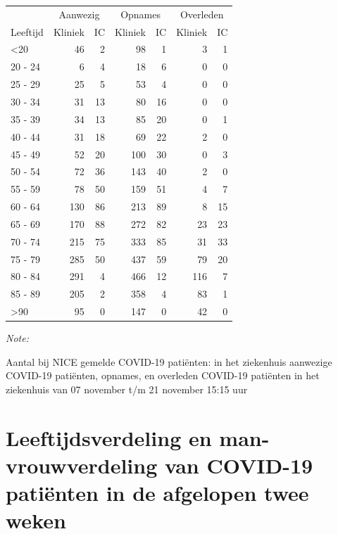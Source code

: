 \documentclass[
  english,
  man,floatsintext]{apa6}
\begin{document}
\begin{table}
\centering\begingroup\fontsize{10}{12}\selectfont

\begin{threeparttable}
\begin{tabular}{lrrrrrr}
\toprule
\multicolumn{1}{c}{ } & \multicolumn{2}{c}{Aanwezig} & \multicolumn{2}{c}{Opnames} & \multicolumn{2}{c}{Overleden} \\
\cmidrule(l{3pt}r{3pt}){2-3} \cmidrule(l{3pt}r{3pt}){4-5} \cmidrule(l{3pt}r{3pt}){6-7}
Leeftijd & Kliniek & IC & Kliniek & IC & Kliniek & IC\\
\midrule
<20 & 46 & 2 & 98 & 1 & 3 & 1\\
20 - 24 & 6 & 4 & 18 & 6 & 0 & 0\\
25 - 29 & 25 & 5 & 53 & 4 & 0 & 0\\
30 - 34 & 31 & 13 & 80 & 16 & 0 & 0\\
35 - 39 & 34 & 13 & 85 & 20 & 0 & 1\\
40 - 44 & 31 & 18 & 69 & 22 & 2 & 0\\
45 - 49 & 52 & 20 & 100 & 30 & 0 & 3\\
50 - 54 & 72 & 36 & 143 & 40 & 2 & 0\\
55 - 59 & 78 & 50 & 159 & 51 & 4 & 7\\
60 - 64 & 130 & 86 & 213 & 89 & 8 & 15\\
65 - 69 & 170 & 88 & 272 & 82 & 23 & 23\\
70 - 74 & 215 & 75 & 333 & 85 & 31 & 33\\
75 - 79 & 285 & 50 & 437 & 59 & 79 & 20\\
80 - 84 & 291 & 4 & 466 & 12 & 116 & 7\\
85 - 89 & 205 & 2 & 358 & 4 & 83 & 1\\
>90 & 95 & 0 & 147 & 0 & 42 & 0\\
\bottomrule
\end{tabular}
\begin{tablenotes}
\item \textit{Note: } 
\item Aantal bij NICE gemelde COVID-19 patiënten: in het ziekenhuis aanwezige COVID-19 patiënten, opnames, en overleden COVID-19 patiënten in het ziekenhuis van 07 november t/m 21 november 15:15 uur
\end{tablenotes}
\end{threeparttable}
\endgroup{}
\end{table}

\newpage

\hypertarget{leeftijdsverdeling-en-man-vrouwverdeling-van-covid-19-patiuxebnten-in-de-afgelopen-twee-weken}{%
\section{Leeftijdsverdeling en man-vrouwverdeling van COVID-19 patiënten in de afgelopen twee weken}\label{leeftijdsverdeling-en-man-vrouwverdeling-van-covid-19-patiuxebnten-in-de-afgelopen-twee-weken}}
\end{document}

